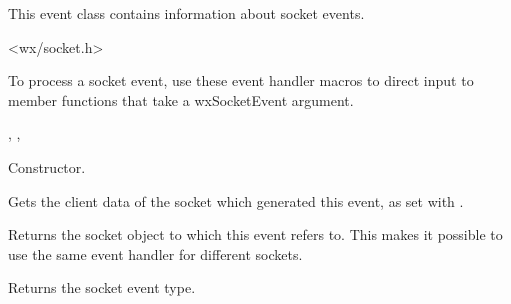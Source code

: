 This event class contains information about socket events.




<wx/socket.h>


To process a socket event, use these event handler macros to direct input to member
functions that take a wxSocketEvent argument.

\twocolwidtha{7cm}
\begin{twocollist}\itemsep=0pt
\end{twocollist}


, 
, 




Constructor.

\label{wxsocketeventgetclientdata}


Gets the client data of the socket which generated this event, as
set with .

\label{wxsocketeventgetsocket}


Returns the socket object to which this event refers to. This makes
it possible to use the same event handler for different sockets.

\label{wxsocketeventgetsocketevent}


Returns the socket event type.

